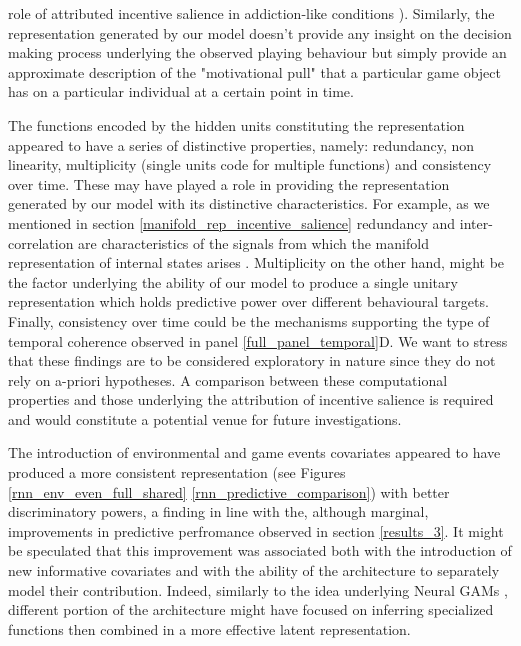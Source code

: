role of attributed incentive salience in addiction-like conditions \cite{robinson1993neural}). Similarly, the representation generated by our model doesn't provide any insight on the decision making process underlying the observed playing behaviour but simply provide an approximate description of the "motivational pull" that a particular game object has on a particular individual at a certain point in time. 

The functions encoded by the hidden units constituting the representation appeared to have a series of distinctive properties, namely: redundancy, non linearity, multiplicity (single units code for multiple functions) and consistency over time. These may have played a role in providing the representation generated by our model with its distinctive characteristics. For example, as we mentioned in section \ref{manifold_rep_incentive_salience} redundancy and inter-correlation are characteristics of the signals from which the manifold representation of internal states arises \cite{seung2000manifold,gallego2017neural}. Multiplicity on the other hand, might be the factor underlying the ability of our model to produce a single unitary representation which holds predictive power over different behavioural targets. Finally, consistency over time could be the mechanisms supporting the type of temporal coherence observed in panel \ref{full_panel_temporal}D. We want to stress that these findings are to be considered exploratory in nature since they do not rely on a-priori hypotheses. A comparison between these computational properties and those underlying the attribution of incentive salience is required and would constitute a potential venue for future investigations. 

The introduction of environmental and game events covariates appeared to have produced a more consistent representation (see Figures \ref{rnn_env_even_full_shared} \ref{rnn_predictive_comparison}) with better discriminatory powers, a finding in line with the, although marginal, improvements in predictive perfromance observed in section \ref{results_3}. It might be speculated that this improvement was associated both with the introduction of new informative covariates and with the ability of the architecture to separately model their contribution. Indeed, similarly to the idea underlying Neural GAMs \cite{agarwal2021neural}, different portion of the architecture might have focused on inferring specialized functions then combined in a more effective latent representation.


